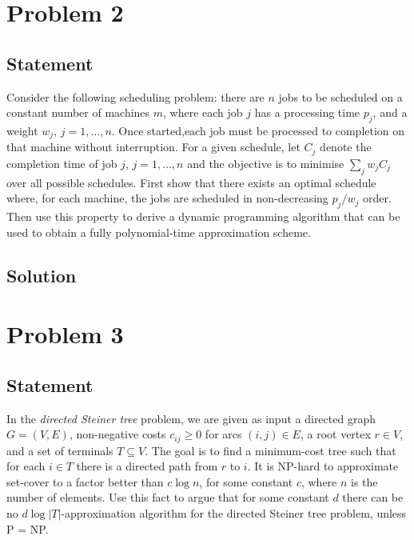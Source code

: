 \documentclass[a4paper]{article}
\begin{document}
\section{Problem 2}
\subsection{Statement}
Consider the following scheduling problem: there are $n$ jobs to be scheduled on a constant number of machines $m$, where each job $j$ has a processing time $p_j$, and a weight $w_j$, $j = 1, \ldots, n$.
Once started,each job must be processed to completion on that machine without interruption. For a given schedule, let $C_j$ denote the completion time of job $j$, $j = 1, \ldots, n$ and the
objective is to minimise $\sum_j w_j C_j$ over all possible schedules. First show that there exists an optimal schedule where, for each machine, the jobs are scheduled in non-decreasing
$p_j/w_j$ order. Then use this property to derive a dynamic programming algorithm that can be used to obtain a fully polynomial-time approximation scheme.
\subsection{Solution}
\newpage

\section{Problem 3}
\subsection{Statement}
In the \emph{directed Steiner tree} problem, we are given as input a directed graph $G = (V, E)$, non-negative costs $c_{ij} \ge 0$ for arcs $(i, j) \in E$, a root vertex $r \in V$, and a set of
terminals $T \subseteq V$. The goal is to find a minimum-cost tree such that for each $i\in T$ there is a directed path from $r$ to $i$. It is NP-hard to approximate set-cover to a factor better than
$c\log n$, for some constant $c$, where $n$ is the number of elements. Use this fact to argue that for some constant $d$ there can be no $d \log |T|$-approximation algorithm for the directed Steiner tree problem, unless P = NP.
\end{document}
